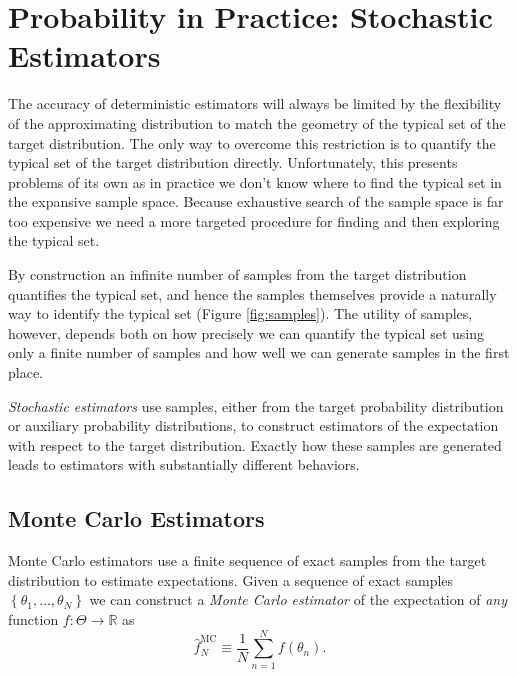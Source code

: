 \documentclass[11pt, oneside]{article}
\newcommand{\RR}{ \mathbb{R} }
\begin{document}
\section{Probability in Practice: Stochastic Estimators}

The accuracy of deterministic estimators will always be limited by
the flexibility of the approximating distribution to match the geometry 
of the typical set of the target distribution.  The only way to overcome
this restriction is to quantify the typical set of the target distribution
directly.  Unfortunately, this presents problems of its own as in practice 
we don't know where to find the typical set in the expansive sample space.  Because exhaustive search of the sample space is far too expensive
we need a more targeted procedure for finding and then exploring 
the typical set.

By construction an infinite number of samples from the target distribution 
quantifies the typical set, and hence the samples themselves provide
a naturally way to identify the typical set (Figure \ref{fig:samples}).  The
utility of samples, however, depends both on how precisely we can 
quantify the typical set using only a finite number of samples and how
well we can generate samples in the first place.

\emph{Stochastic estimators} use samples, either from the target probability
distribution or auxiliary probability distributions, to construct estimators 
of the expectation with respect to the target distribution.  Exactly how these
samples are generated leads to estimators with substantially different 
behaviors.

\subsection{Monte Carlo Estimators}

Monte Carlo estimators use a finite sequence of exact samples from
the target distribution to estimate expectations.  Given a sequence
of exact samples $\left\{ \theta_{1}, \ldots, \theta_{N} \right\}$ we can
construct a  \emph{Monte Carlo estimator} of the expectation of 
\emph{any} function $f : \Theta \rightarrow \RR$ as
%
\begin{equation*}
\hat{f}^{\mathrm{MC}}_{N} \equiv
\frac{1}{N} \sum_{n = 1}^{N} f \! \left( \theta_{n} \right).
\end{equation*}
\end{document}
